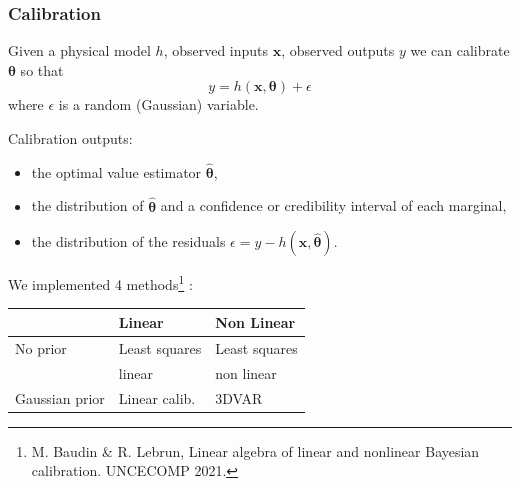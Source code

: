\documentclass{beamer}
\begin{document}

\begin{frame}
\frametitle{Calibration}

Given a physical model $h$, observed inputs $\boldsymbol{x}$, 
observed outputs $y$ we can calibrate $\boldsymbol{\theta}$ so that 
$$
y = h(\boldsymbol{x}, \boldsymbol{\theta}) + \epsilon
$$
where $\epsilon$ is a random (Gaussian) variable.

Calibration outputs:
\begin{itemize}
\item the optimal value estimator $\hat{\boldsymbol{\theta}}$,
\item the distribution of $\hat{\boldsymbol{\theta}}$ and a confidence or credibility 
interval of each marginal,
\item the distribution of the residuals $\epsilon = y - h(\boldsymbol{x}, \hat{\boldsymbol{\theta}})$.
\end{itemize}

We implemented 4 methods\footnote{M. Baudin \& R. Lebrun, Linear algebra of linear and nonlinear Bayesian calibration. UNCECOMP 2021.} :

\begin{center}
\begin{tabular}{lll}
                     & {\bf Linear} & {\bf Non Linear} \\
\hline
No prior             & Least squares & Least squares \\
                     & linear        &  non linear \\
\hline
Gaussian prior       & Linear calib. & 3DVAR \\
\hline
\end{tabular}
\end{center}

\end{frame}


\end{document}

